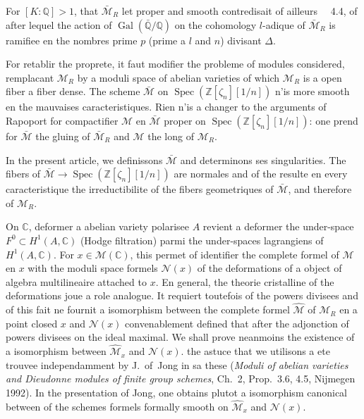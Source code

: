 \documentclass[11pt,a4paper]{article}
\theoremstyle{plain}
\theoremstyle{definition}
\DeclareMathOperator{\Spec}{Spec}
\DeclareMathOperator{\Gal}{Gal}
\begin{document}
For $[K : \mathbb{Q}] > 1$, that $\bar{\mathscr{M}}_R$ let proper and smooth contredisait of ailleurs
~\cite{HLR}~4.4, of after lequel the action of $\Gal(\bar{\mathbb{Q}}/\mathbb{Q})$ on the cohomology
$l$-adique of $\bar{\mathscr{M}}_R$ is ramifiee en the nombres prime $p$ (prime a $l$ and $n$)
divisant $\Delta$.

For retablir the proprete, it faut modifier the probleme of modules considered,
remplacant $\mathscr{M}_R$ by a moduli space of abelian varieties of which $\mathscr{M}_R$
is a open fiber a fiber dense. The scheme $\bar{\mathscr{M}}$ on $\Spec(\mathbb{Z}[\zeta_n][1/n])$ n'is more
smooth en the mauvaises caracteristiques. Rien n'is a changer to the arguments of
Rapoport for compactifier $\mathscr{M}$ en $\bar{\mathscr{M}}$ proper on $\Spec(\mathbb{Z}[\zeta_n][1/n])$: one prend
for $\bar{\mathscr{M}}$ the gluing of $\bar{\mathscr{M}}_R$ and $\mathscr{M}$ the long of $\mathscr{M}_R$.

In the present article, we definissons $\bar{\mathscr{M}}$ and determinons ses singularities.
The fibers of $\bar{\mathscr{M}} \to \Spec(\mathbb{Z}[\zeta_n][1/n])$ are normales and of the resulte en every
caracteristique the irreductibilite of the fibers geometriques of $\bar{\mathscr{M}}$, and therefore of $\mathscr{M}_R$.

On $\mathbb{C}$, deformer a abelian variety polarisee $A$ revient a deformer the
under-space $F^0 \subset H^1(A, \mathbb{C})$ (Hodge filtration) parmi the under-spaces lagrangiens
of $H^1(A, \mathbb{C})$. For $x \in \mathscr{M}(\mathbb{C})$, this permet of identifier the complete formel of
$\mathscr{M}$ en $x$ with the moduli space formels $\mathcal{N}(x)$ of the deformations of a object
of algebra multilineaire attached to $x$. En general, the theorie cristalline of the
deformations joue a role analogue. It requiert toutefois of the powers
divisees and of this fait ne fournit a isomorphism between the complete formel $\hat{\mathscr{M}}$
of $\mathscr{M}_R$ en a point closed $x$ and $\mathcal{N}(x)$ convenablement defined that after
the adjonction of powers divisees on the ideal maximal. We shall prove
neanmoins the existence of a isomorphism between $\hat{\mathscr{M}}_x$ and $\mathcal{N}(x)$. the astuce that
we utilisons a ete trouvee independamment by J.~of~Jong in sa these
(\textit{Moduli of abelian varieties and Dieudonne modules of finite group schemes},
Ch.~2, Prop.~3.6, 4.5, Nijmegen 1992). In the presentation of Jong, one obtains plutot a isomorphism canonical between of the schemes formels formally
smooth on $\hat{\mathscr{M}}_x$ and $\mathcal{N}(x)$.
\end{document}
